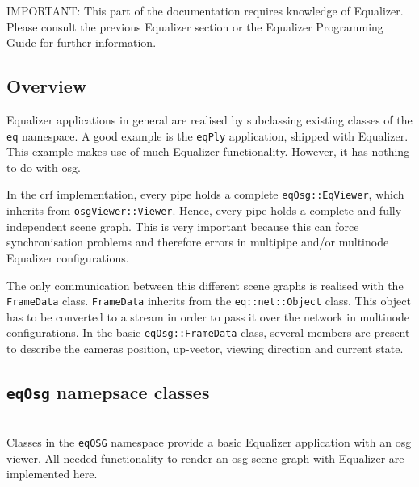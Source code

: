 IMPORTANT: This part of the documentation requires knowledge of Equalizer. Please consult the previous Equalizer section or the Equalizer Programming Guide \cite{eqPG} for further information.

\subsection{Overview}
Equalizer applications in general are realised by subclassing existing classes of the \texttt{eq} namespace. A good example is the \texttt{eqPly} application, shipped with Equalizer. This example makes use of much Equalizer functionality. However, it has nothing to do with \gls{osg}.

In the \gls{crf} implementation, every pipe holds a complete \texttt{eqOsg::EqViewer}, which inherits from \texttt{osgViewer::Viewer}. Hence, every pipe holds a complete and fully independent scene graph. This is very important because this can force synchronisation problems and therefore errors in multipipe and/or multinode Equalizer configurations.

The only communication between this different scene graphs is realised with the \texttt{FrameData} class. \texttt{FrameData} inherits from the \texttt{eq::net::Object} class. This object has to be converted to a stream in order to pass it over the network in multinode configurations. In the basic \texttt{eqOsg::FrameData} class, several members are present to describe the cameras position, up-vector, viewing direction and current state. 

\subsection{\texttt{eqOsg} namepsace classes}
\label{sec:Overview}\hfill\\
Classes in the \texttt{eqOSG} namespace provide a basic Equalizer application with an \gls{osg} viewer. All needed functionality to render an \gls{osg} scene graph with Equalizer are implemented here.

